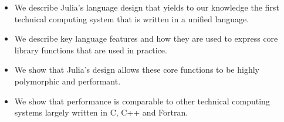 \begin{itemize}
\item We describe Julia's language design that yields to our knowledge the first technical computing system that is written in a unified language.
\item We describe key language features and how they are used to express core library functions that are used in practice.
\item We show that Julia's design allows these core functions to be highly polymorphic and performant.
\item We show that performance is comparable to other technical computing systems largely written in C, C++ and Fortran.
\end{itemize}

%



